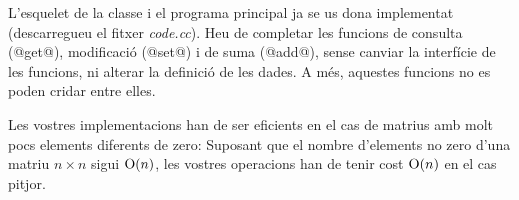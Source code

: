 \medskip

L'esquelet de la classe i el programa principal ja se us dona implementat
(descarregueu el fitxer \textit{code.cc}).  Heu de completar les funcions de
consulta (@get@), modificació (@set@) i de suma (@add@), sense canviar la
interfície de les funcions, ni alterar la definició de les dades. A més,
aquestes funcions no es poden cridar entre elles.

\medskip

Les vostres implementacions han de ser eficients en el cas de matrius
amb molt pocs elements diferents de zero: Suposant que el nombre d'elements
no zero d'una matriu $n\times n$ sigui $\text O(n)$, les vostres operacions
han de tenir cost $\text O(n)$ en el cas pitjor.

\clearpage

\Sample
